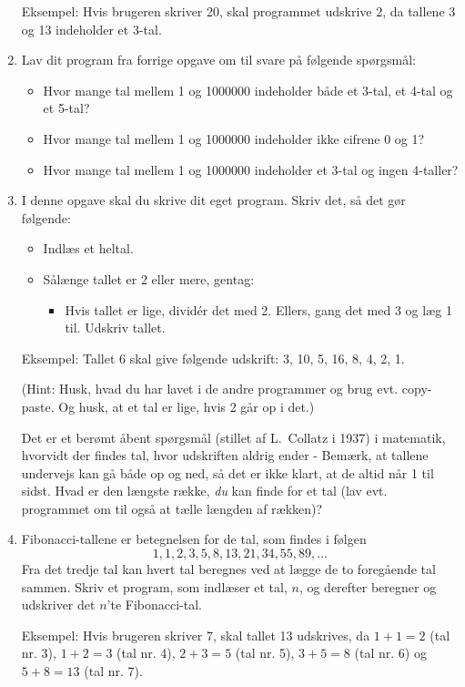 \documentclass[12pt]{article}
\begin{document}
\begin{enumerate}
Eksempel: Hvis brugeren skriver 20, skal programmet
udskrive 2, da tallene 3 og 13 indeholder et 3-tal.

\item Lav dit program fra forrige opgave om til svare på følgende spørgsmål:
\begin{itemize}
\item Hvor mange tal mellem 1 og 1000000 indeholder både et 3-tal, et 4-tal og et 5-tal?
\item Hvor mange tal mellem 1 og 1000000 indeholder ikke cifrene 0 og 1?
\item Hvor mange tal mellem 1 og 1000000 indeholder et 3-tal og ingen 4-taller?
\end{itemize}

\item I denne opgave skal du skrive dit eget program.
Skriv det, så det gør følgende:
\begin{itemize}
	\item Indlæs et heltal.
	\item Sålænge tallet er 2 eller mere, gentag:
	\begin{itemize}
		\item Hvis tallet er lige, dividér det med 2. Ellers, gang det med 3 og læg 1
til. Udskriv tallet.
	\end{itemize}
\end{itemize}

Eksempel: Tallet 6 skal give følgende udskrift: 3, 10, 5, 16, 8, 4, 2, 1.

(Hint: Husk, hvad du har lavet i de andre programmer og brug evt.
copy-paste. Og husk, at et tal er lige, hvis 2 går op i det.)

Det er et berømt åbent spørgsmål (stillet af L.~Collatz i 1937) i matematik,
hvorvidt der findes tal, hvor udskriften aldrig ender - Bemærk, at tallene
undervejs kan gå både op og ned, så det er ikke klart, at de altid når 1 til
sidst. Hvad er den længste række, \emph{du} kan finde for et tal (lav
evt. programmet om til også at tælle længden af rækken)?


\item Fibonacci-tallene er betegnelsen for de tal, som findes i følgen \[
1, 1, 2, 3, 5, 8, 13, 21, 34, 55, 89, \ldots
\]
Fra det tredje tal kan hvert tal beregnes ved at lægge de to foregående tal sammen.
Skriv et program, som indlæser et tal, $n$, og derefter
beregner og udskriver det $n$'te Fibonacci-tal.

Eksempel: Hvis brugeren skriver 7, skal tallet 13 udskrives, da $1+1 = 2$ (tal nr. 3), $1+2 = 3$ (tal nr. 4), $2+3 = 5$ (tal nr. 5), $3+5 = 8$ (tal nr. 6) og $5+8 = 13$ (tal nr. 7).


\end{enumerate}
\end{document}

